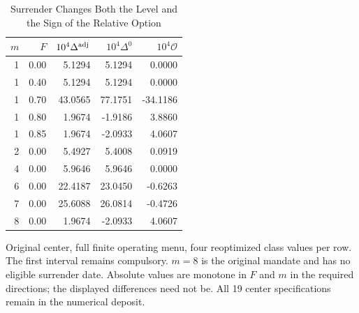\begin{table}[tbp]
\centering\small
\caption{Surrender Changes Both the Level and the Sign of the Relative Option}
\label{tab:r9_surrender}
\begin{tabular}{rrrrr}
\toprule
$m$ & $F$ & $10^4\Delta^{\rm adj}$ & $10^4\Delta^0$ & $10^4\mathcal O$ \\
\midrule
1 & 0.00 & 5.1294 & 5.1294 & 0.0000 \\
1 & 0.40 & 5.1294 & 5.1294 & 0.0000 \\
1 & 0.70 & 43.0565 & 77.1751 & -34.1186 \\
1 & 0.80 & 1.9674 & -1.9186 & 3.8860 \\
1 & 0.85 & 1.9674 & -2.0933 & 4.0607 \\
2 & 0.00 & 5.4927 & 5.4008 & 0.0919 \\
4 & 0.00 & 5.9646 & 5.9646 & 0.0000 \\
6 & 0.00 & 22.4187 & 23.0450 & -0.6263 \\
7 & 0.00 & 25.6088 & 26.0814 & -0.4726 \\
8 & 0.00 & 1.9674 & -2.0933 & 4.0607 \\
\bottomrule
\end{tabular}
\begin{minipage}{0.98\textwidth}\footnotesize\medskip
Original center, full finite operating menu, four reoptimized class values per row. The first interval remains compulsory. $m=8$ is the original mandate and has no eligible surrender date. Absolute values are monotone in $F$ and $m$ in the required directions; the displayed differences need not be. All 19 center specifications remain in the numerical deposit.
\end{minipage}
\end{table}
